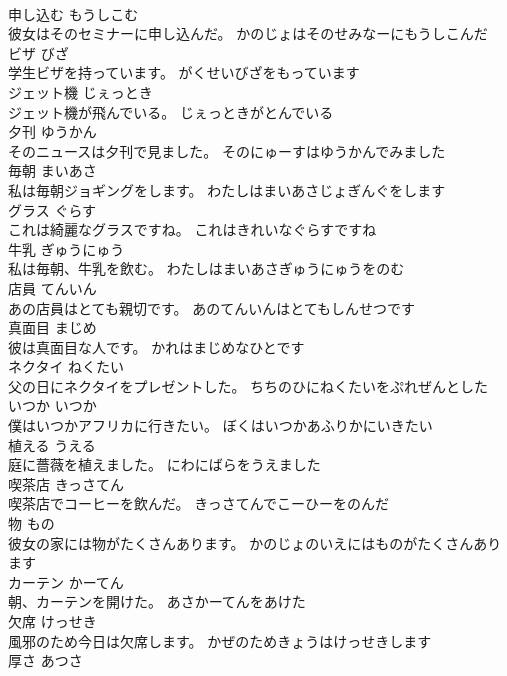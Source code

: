 \documentclass[8pt]{extreport}
\begin{document}
\begin{CJK}{UTF8}{min}
\\	申し込む	もうしこむ	
\\	彼女はそのセミナーに申し込んだ。	かのじょはそのせみなーにもうしこんだ	
\\	ビザ	びざ	
\\	学生ビザを持っています。	がくせいびざをもっています	
\\	ジェット機	じぇっとき	
\\	ジェット機が飛んでいる。	じぇっときがとんでいる	
\\	夕刊	ゆうかん	
\\	そのニュースは夕刊で見ました。	そのにゅーすはゆうかんでみました	
\\	毎朝	まいあさ	
\\	私は毎朝ジョギングをします。	わたしはまいあさじょぎんぐをします	
\\	グラス	ぐらす	
\\	これは綺麗なグラスですね。	これはきれいなぐらすですね	
\\	牛乳	ぎゅうにゅう	
\\	私は毎朝、牛乳を飲む。	わたしはまいあさぎゅうにゅうをのむ	
\\	店員	てんいん	
\\	あの店員はとても親切です。	あのてんいんはとてもしんせつです	
\\	真面目	まじめ	
\\	彼は真面目な人です。	かれはまじめなひとです	
\\	ネクタイ	ねくたい	
\\	父の日にネクタイをプレゼントした。	ちちのひにねくたいをぷれぜんとした	
\\	いつか	いつか	
\\	僕はいつかアフリカに行きたい。	ぼくはいつかあふりかにいきたい	
\\	植える	うえる	
\\	庭に薔薇を植えました。	にわにばらをうえました	
\\	喫茶店	きっさてん	
\\	喫茶店でコーヒーを飲んだ。	きっさてんでこーひーをのんだ	
\\	物	もの	
\\	彼女の家には物がたくさんあります。	かのじょのいえにはものがたくさんあります	
\\	カーテン	かーてん	
\\	朝、カーテンを開けた。	あさかーてんをあけた	
\\	欠席	けっせき	
\\	風邪のため今日は欠席します。	かぜのためきょうはけっせきします	
\\	厚さ	あつさ	

\end{CJK}
\end{document}
